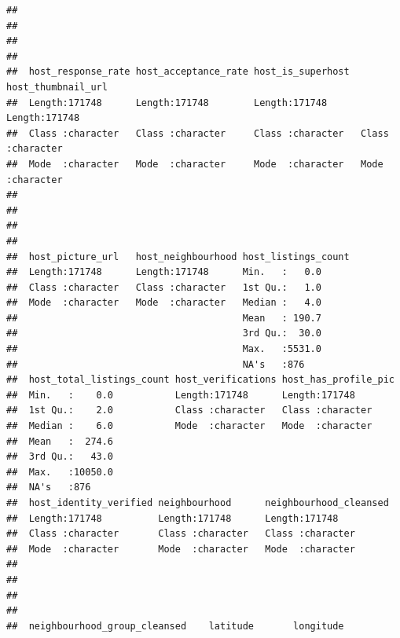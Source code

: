 \documentclass[
]{article}
\begin{document}
\begin{verbatim}
##                                                                             
##                                                                             
##                                                                             
##                                                                             
##  host_response_rate host_acceptance_rate host_is_superhost  host_thumbnail_url
##  Length:171748      Length:171748        Length:171748      Length:171748     
##  Class :character   Class :character     Class :character   Class :character  
##  Mode  :character   Mode  :character     Mode  :character   Mode  :character  
##                                                                               
##                                                                               
##                                                                               
##                                                                               
##  host_picture_url   host_neighbourhood host_listings_count
##  Length:171748      Length:171748      Min.   :   0.0     
##  Class :character   Class :character   1st Qu.:   1.0     
##  Mode  :character   Mode  :character   Median :   4.0     
##                                        Mean   : 190.7     
##                                        3rd Qu.:  30.0     
##                                        Max.   :5531.0     
##                                        NA's   :876        
##  host_total_listings_count host_verifications host_has_profile_pic
##  Min.   :    0.0           Length:171748      Length:171748       
##  1st Qu.:    2.0           Class :character   Class :character    
##  Median :    6.0           Mode  :character   Mode  :character    
##  Mean   :  274.6                                                  
##  3rd Qu.:   43.0                                                  
##  Max.   :10050.0                                                  
##  NA's   :876                                                      
##  host_identity_verified neighbourhood      neighbourhood_cleansed
##  Length:171748          Length:171748      Length:171748         
##  Class :character       Class :character   Class :character      
##  Mode  :character       Mode  :character   Mode  :character      
##                                                                  
##                                                                  
##                                                                  
##                                                                  
##  neighbourhood_group_cleansed    latitude       longitude     

\end{verbatim}
\end{document}
